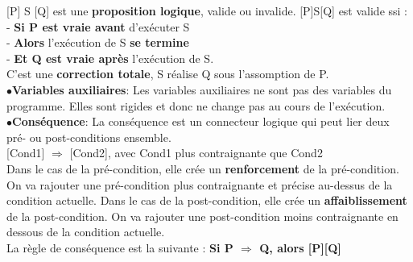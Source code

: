 [P] S [Q] est une \textbf{proposition logique}, valide ou invalide. [P]S[Q] est valide ssi : \\- \hspace{5mm} \textbf{Si P est vraie avant} d'exécuter S\\- \hspace{5mm} \textbf{Alors} l'exécution de S \textbf{se termine}\\- \hspace{5mm} \textbf{Et Q est vraie après} l'exécution de S.\\ \hspace{5mm}
C'est une \textbf{correction totale}, S réalise Q sous l'assomption de P.\\

$\bullet$\textbf{Variables auxiliaires}:
Les variables auxiliaires ne sont pas des variables du programme. Elles sont rigides et donc ne change pas au cours de l'exécution.\\

$\bullet$\textbf{Conséquence}:
La conséquence est un connecteur logique qui peut lier deux pré- ou post-conditions ensemble.\\

[Cond1] $\Rightarrow$ [Cond2], avec Cond1 plus contraignante que Cond2\\

Dans le cas de la pré-condition, elle crée un \textbf{renforcement} de la pré-condition. On va rajouter une pré-condition plus contraignante et précise au-dessus de la condition actuelle.
Dans le cas de la post-condition, elle crée un \textbf{affaiblissement} de la post-condition. On va rajouter une post-condition moins contraignante en dessous de la condition actuelle. \\

La règle de conséquence est la suivante : \textbf{Si P $\Rightarrow$ Q, alors [P][Q]}